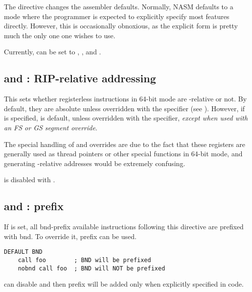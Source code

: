 
The  directive changes the assembler defaults. Normally,
NASM defaults to a mode where the programmer is expected to explicitly
specify most features directly. However, this is occasionally obnoxious,
as the explicit form is pretty much the only one one wishes to use.

Currently,  can be set to , , 
and .

\subsection{ and : RIP-relative addressing}
\label{subsec:relabs}

This sets whether registerless instructions in 64-bit mode are
-relative or not. By default, they are absolute unless
overridden with the  specifier (see ).
However, if  is specified,  is default, unless
overridden with the  specifier, \emph{except when used with an
FS or GS segment override}.

The special handling of  and  overrides are due to the
fact that these registers are generally used as thread pointers or
other special functions in 64-bit mode, and generating
-relative addresses would be extremely confusing.

 is disabled with .

\subsection{ and :  prefix}
\label{subsec:bndnobnd}

If  is set, all bnd-prefix available instructions
following this directive are prefixed with bnd. To override it,
 prefix can be used.

\begin{lstlisting}
DEFAULT BND
    call foo        ; BND will be prefixed
    nobnd call foo  ; BND will NOT be prefixed
\end{lstlisting}

 can disable  and then
 prefix will be added only when explicitly specified
in code.

